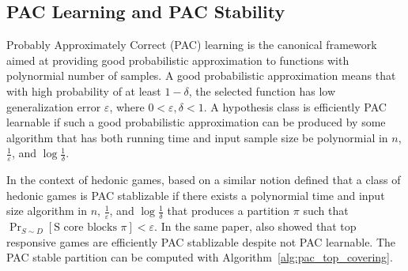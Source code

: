 \documentclass[letterpaper]{article} %
\begin{document}
\subsection{PAC Learning and PAC Stability}
Probably Approximately Correct (PAC) learning is the canonical framework aimed at providing good probabilistic approximation to functions with polynormial number of samples. A good probabilistic approximation means that with high probability of at least $1 - \delta$, the selected function has low generalization error $\varepsilon$, where $0 < \varepsilon, \delta < 1$. A hypothesis class is efficiently PAC learnable if such a good probabilistic approximation can be produced by some algorithm that has both running time and input sample size be polynormial in $n$, $\frac{1}{\varepsilon}$, and $\log{\frac{1}{\delta}}$.

In the context of hedonic games, based on a similar notion \cite{ijcai2017-380} defined that a class of hedonic games is PAC stablizable if there exists a polynormial time and input size algorithm in $n$, $\frac{1}{\varepsilon}$, and $\log{\frac{1}{\delta}}$ that produces a partition $\pi$ such that $\Pr_{S\sim D}[\text{S core blocks } \pi] < \varepsilon$. In the same paper, \cite{ijcai2017-380} also showed that top responsive games are efficiently PAC stablizable despite not PAC learnable. The PAC stable partition can be computed with Algorithm~\ref{alg:pac_top_covering}.
\end{document}

